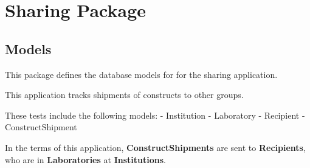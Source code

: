 \documentclass[letterpaper,10pt,english]{sphinxmanual}
\begin{document}
\section{Sharing Package}
\label{api:sharing-package}\label{api:module-experimentdb.sharing}

\subsection{Models}
\label{api:id23}\label{api:module-experimentdb.sharing.models}
This package defines the database models for for the sharing application.


This application tracks shipments of constructs to other groups.


These tests include the following models:
- Institution
- Laboratory
- Recipient
- ConstructShipment


In the terms of this application, \textbf{ConstructShipments} are sent to \textbf{Recipients}, who are in \textbf{Laboratories} at \textbf{Institutions}.

\end{document}
